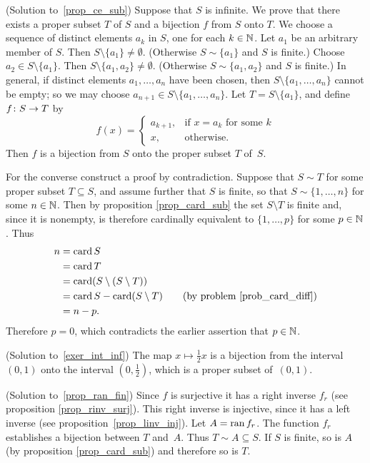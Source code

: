 \begin{prf}\label{sol_prop_ce_sub}(Solution to~\ref{prop_ce_sub})
Suppose that $S$ is infinite.  We prove that there exists a proper subset $T$ of $S$ and a
bijection $f$ from $S$ onto $T$. We choose a sequence of distinct elements $a_k$ in $S$, one
for each $k \in \mathbb{N}$. Let $a_1$ be an arbitrary member of $S$. Then $S \setminus \{a_1\} \ne
\emptyset$. (Otherwise $S \sim \{a_1\}$ and $S$ is finite.) Choose $a_2 \in S \setminus
\{a_1\}$. Then $S \setminus \{a_1,a_2\} \ne \emptyset$. (Otherwise $S \sim \{a_1,a_2\}$ and
$S$ is finite.) In general, if distinct elements $a_1,\dots,a_n$ have been chosen, then $S
\setminus \{a_1,\dots,a_n\}$ cannot be empty; so we may choose $a_{n+1} \in S \setminus
\{a_1,\dots,a_n\}$. Let $T = S \setminus \{a_1\}$, and define $f \colon S \rightarrow T$ by
   \[f(x) = \begin{cases}
                 a_{k+1}, &\text{if $x=a_k$ for some $k$}\\
                 x,       &\text{otherwise}.
            \end{cases}\]
Then $f$ is a bijection from $S$ onto the proper subset $T$ of~$S$.

For the converse construct a proof by contradiction. Suppose that $S \sim T$ for some proper
subset $T \subseteq S$, and assume further that $S$ is finite, so that $S \sim \{1,\dots,n\}$
for some $n \in \mathbb{N}$. Then by proposition \ref{prop_card_sub} the set $S \setminus T$ is finite
and, since it is nonempty, is therefore cardinally equivalent to $\{1,\dots,p\}$ for some $p
\in \mathbb{N}$. Thus
  \begin{align*}
       n &= \operatorname{card} S\\
         &= \operatorname{card} T\\
         &= \operatorname{card} (S \setminus (S \setminus T))\\
         &= \operatorname{card} S - \operatorname{card}(S \setminus T)\qquad \text{(by problem \ref{prob_card_diff})} \\
         &= n - p.
  \end{align*}
Therefore $p = 0$, which contradicts the earlier assertion that $p \in \mathbb{N}$.
\end{prf}

\begin{prf}\label{sol_exer_int_inf}(Solution to~\ref{exer_int_inf})
The map $x \mapsto \frac12x$ is a bijection from the interval $(0,1)$ onto the interval
$(0,\frac12)$, which is a proper subset of~$(0,1)$.
\end{prf}

\begin{prf}\label{sol_prop_ran_fin}(Solution to~\ref{prop_ran_fin})
Since $f$ is surjective it has a right inverse $f_r$ (see proposition \ref{prop_rinv_surj}).
This right inverse is injective, since it has a left inverse (see
proposition~\ref{prop_linv_inj}). Let $A = \operatorname{ran} f_r$. The function $f_r$ establishes a
bijection between $T$ and~$A$. Thus $T \sim A \subseteq S$. If $S$ is finite, so is $A$ (by
proposition \ref{prop_card_sub}) and therefore so is $T$.
\end{prf}

